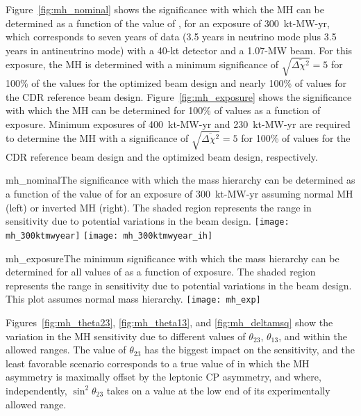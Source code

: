 Figure~\ref{fig:mh_nominal} shows the significance with which the MH can be determined as a function of the value of \deltacp, for an exposure of 300~kt-MW-yr, which corresponds to seven years of data (3.5 years in neutrino mode plus 3.5 years in antineutrino mode) with a 40-kt detector and a 1.07-MW beam.  For this exposure, the MH is determined with a minimum significance of $\sqrt{\overline{\Delta\chi^{2}}} = 5$ for 100\% of the \deltacp values for the optimized beam design and nearly 100\% of \deltacp values for the CDR reference beam design.  Figure~\ref{fig:mh_exposure} shows the significance with which the MH can be determined for 100\% of \deltacp values as a function of exposure.  Minimum exposures of 400~kt-MW-yr and 230~kt-MW-yr are required to determine the MH with a significance of $\sqrt{\overline{\Delta\chi^2}} = 5$ for 100\% of \deltacp values for the CDR reference beam design and the optimized beam design, respectively.

\begin{cdrfigure}{mh_nominal}{The significance with which the mass hierarchy can be determined as a function of the value of \deltacp for an exposure of 300~kt-MW-yr assuming normal MH (left) or inverted MH (right).  The shaded region represents the range in sensitivity due to potential variations in the beam design.}
 \texttt{[image: mh\_300ktmwyear]}
 \texttt{[image: mh\_300ktmwyear\_ih]}
\end{cdrfigure}

\begin{cdrfigure}{mh_exposure}{The minimum significance with which the mass hierarchy can be determined for all values of \deltacp as a function of exposure.  The shaded region represents the range in sensitivity due to potential variations in the beam design. This plot assumes normal mass hierarchy.}
 \texttt{[image: mh\_exp]}
\end{cdrfigure}

Figures~\ref{fig:mh_theta23}, \ref{fig:mh_theta13}, and \ref{fig:mh_deltamsq} show the variation in the MH sensitivity due to different values of $\theta_{23}$, $\theta_{13}$, and  within the allowed ranges.  The value of $\theta_{23}$ has the biggest impact on the sensitivity, and the least favorable scenario corresponds to a true value of \deltacp in which the MH asymmetry
is maximally offset by the leptonic CP asymmetry, and where, independently, 
$\sin^2{\theta_{23}}$ takes on a value at the low end of its 
experimentally allowed range.

